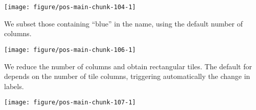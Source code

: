\documentclass[krantz2]{krantz}\usepackage{knitr}%
\begin{document}
\begin{knitrout}\footnotesize
{}\color{fgcolor}\begin{kframe}
\begin{alltt}
\hlstd{(}\hlstd{())} \hlopt{+}
  \hlstd{(}\hlstd{,}
           \hlstd{=} \hlstd{)}
\end{alltt}
\end{kframe}

{\centering \texttt{[image: figure/pos-main-chunk-104-1]} 

}



\end{knitrout}
\label{chunk:plot:color:tiles}



We subset those containing ``blue'' in the name, using the default number of columns.

\begin{knitrout}\footnotesize
{}\color{fgcolor}\begin{kframe}
\begin{alltt}
\hlstd{(}\hlstd{(}\hlstd{,} \hlstd{(),}  \hlstd{=} \hlstd{),}  \hlstd{=} \hlstd{)}
\end{alltt}
\end{kframe}

{\centering \texttt{[image: figure/pos-main-chunk-106-1]} 

}



\end{knitrout}

We reduce the number of columns and obtain rectangular tiles. The default for  depends on the number of tile columns, triggering automatically the change in labels.

\begin{knitrout}\footnotesize
{}\color{fgcolor}\begin{kframe}
\begin{alltt}
\hlstd{(}\hlstd{(}\hlstd{,} \hlstd{(),}  \hlstd{=} \hlstd{),}  \hlstd{=} \hlstd{)}
\end{alltt}
\end{kframe}

{\centering \texttt{[image: figure/pos-main-chunk-107-1]} 

}



\end{knitrout}
\end{document}

